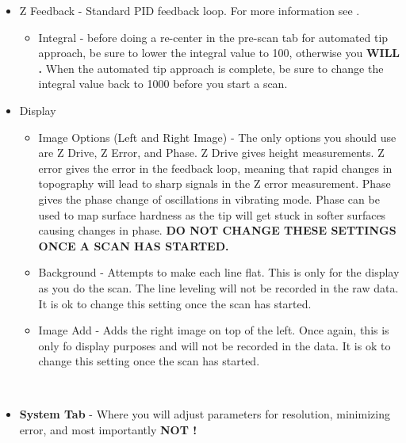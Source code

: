 \documentclass{../lab}
\begin{document}
\begin{itemize}
    \item Z Feedback - Standard PID feedback loop. For more information see .

    \begin{itemize}
        \item ​Integral - before doing a re-center in the pre-scan tab for automated tip approach, be sure to lower the integral value to 100, otherwise you \textbf{WILL .}   When the automated tip approach is complete, be sure to change the integral value back to 1000 before you start a scan.

    \end{itemize}

    \item Display

    \begin{itemize}
        \item Image Options (Left and Right Image) - The only options you should use are Z Drive, Z Error, and Phase. Z Drive gives height measurements. Z error gives the error in the feedback loop, meaning that rapid changes in topography will lead to sharp signals in the Z error measurement. Phase gives the phase change of oscillations in vibrating mode. Phase can be used to map surface hardness as the tip will get stuck in softer surfaces causing changes in phase. \textbf{DO NOT CHANGE THESE SETTINGS ONCE A SCAN HAS STARTED.}

        \item Background - Attempts to make each line flat. This is only for the display as you do the scan. The line leveling will not be recorded in the raw data. It is ok to change this setting once the scan has started.

        \item Image Add - Adds the right image on top of the left. Once again, this is only fo display purposes and will not be recorded in the data. It is ok to change this setting once the scan has started.

    \end{itemize}

\end{itemize}

\textbf{​}

\begin{itemize}
    \item \textbf{System Tab} - Where you will adjust parameters for resolution, minimizing error, and most importantly \textbf{NOT !}

\end{itemize}
\end{document}
